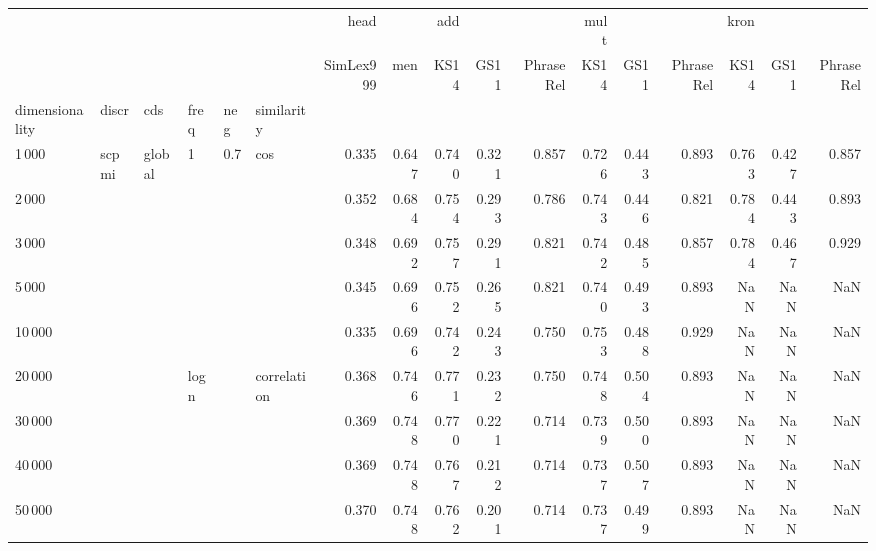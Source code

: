 \begin{tabular}{llllllrrrrrrrrrrr}
\toprule
      &       &        &   &     &             &      head &        &    add &        &           &   mult &        &           &   kron &        &           \\
      &       &        &   &     &             & SimLex999 &    men &   KS14 &   GS11 & PhraseRel &   KS14 &   GS11 & PhraseRel &   KS14 &   GS11 & PhraseRel \\
dimensionality & discr & cds & freq & neg & similarity &           &        &        &        &           &        &        &           &        &        &           \\
\midrule
1\,000  & scpmi & global & 1 & 0.7 & cos &     0.335 &  0.647 &  0.740 &  0.321 &     0.857 &  0.726 &  0.443 &     0.893 &  0.763 &  0.427 &     0.857 \\
2\,000  &       &        &   &     &             &     0.352 &  0.684 &  0.754 &  0.293 &     0.786 &  0.743 &  0.446 &     0.821 &  0.784 &  0.443 &     0.893 \\
3\,000  &       &        &   &     &             &     0.348 &  0.692 &  0.757 &  0.291 &     0.821 &  0.742 &  0.485 &     0.857 &  0.784 &  0.467 &     0.929 \\
5\,000  &       &        &   &     &             &     0.345 &  0.696 &  0.752 &  0.265 &     0.821 &  0.740 &  0.493 &     0.893 &    NaN &    NaN &       NaN \\
10\,000 &       &        &   &     &             &     0.335 &  0.696 &  0.742 &  0.243 &     0.750 &  0.753 &  0.488 &     0.929 &    NaN &    NaN &       NaN \\
20\,000 &       &        & logn &     & correlation &     0.368 &  0.746 &  0.771 &  0.232 &     0.750 &  0.748 &  0.504 &     0.893 &    NaN &    NaN &       NaN \\
30\,000 &       &        &   &     &             &     0.369 &  0.748 &  0.770 &  0.221 &     0.714 &  0.739 &  0.500 &     0.893 &    NaN &    NaN &       NaN \\
40\,000 &       &        &   &     &             &     0.369 &  0.748 &  0.767 &  0.212 &     0.714 &  0.737 &  0.507 &     0.893 &    NaN &    NaN &       NaN \\
50\,000 &       &        &   &     &             &     0.370 &  0.748 &  0.762 &  0.201 &     0.714 &  0.737 &  0.499 &     0.893 &    NaN &    NaN &       NaN \\
\bottomrule
\end{tabular}
